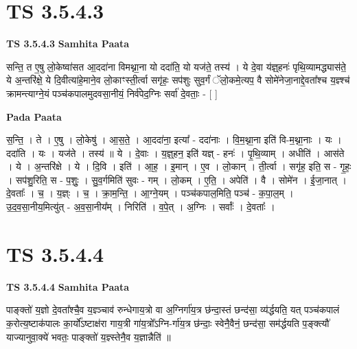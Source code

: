 \documentclass[17pt]{extarticle}
\begin{document}
\section*{ TS 3.5.4.3 }

\textbf{TS 3.5.4.3 } \newline
\textbf{Samhita Paata} \newline

सन्ति॒ त ए॒षु लो॒केष्वा॑सत आ॒ददा॑ना विमथ्ना॒ना यो ददा॑ति॒ यो यज॑ते॒ तस्य॑ । ये दे॒वा य॑ज्ञ्॒हनः॑ पृथि॒व्यामद्ध्यास॑ते॒ ये अ॒न्तरि॑क्षे॒ ये दि॒वीत्या॑हे॒माने॒व लो॒काꣳस्ती॒र्त्वा सगृ॑हः॒ सप॑शुः सुव॒र्गं ॅलो॒कमे॒त्यप॒ वै सोमे॑नेजा॒नाद्दे॒वता᳚श्च य॒ज्ञ्श्च॑ क्रामन्त्याग्ने॒यं पञ्च॑कपालमुदवसा॒नीयं॒ निर्व॑पेद॒ग्निः सर्वा॑ दे॒वताः॒ - [  ] \newline

\textbf{Pada Paata} \newline

स॒न्ति॒ । ते । ए॒षु । लो॒केषु॑ । आ॒स॒ते॒ । आ॒ददा॑ना॒ इत्या᳚ - ददा॑नाः । वि॒म॒थ्ना॒ना इति॑ वि-म॒थ्ना॒नाः । यः । ददा॑ति । यः । यज॑ते । तस्य॑ ॥ ये । दे॒वाः । य॒ज्ञ्॒हन॒ इति॑ यज्ञ् - हनः॑ । पृ॒थि॒व्याम् । अधीति॑ । आस॑ते । ये । अ॒न्तरि॑क्षे । ये । दि॒वि । इति॑ । आ॒ह॒ । इ॒मान् । ए॒व । लो॒कान् । ती॒र्त्वा । सगृ॑ह॒ इति॒ स - गृ॒हः॒ । सप॑शु॒रिति॒ स - प॒शुः॒ । सु॒व॒र्गमिति॑ सुवः - गम् । लो॒कम् । ए॒ति॒ । अपेति॑ । वै । सोमे॑न । ई॒जा॒नात् । दे॒वताः᳚ । च॒ । य॒ज्ञ्ः । च॒ । क्रा॒म॒न्ति॒ । आ॒ग्ने॒यम् । पञ्च॑कपाल॒मिति॒ पञ्च॑ - क॒पा॒ल॒म् । उ॒द॒व॒सा॒नीय॒मित्यु॑त् - अ॒व॒सा॒नीय᳚म् । निरिति॑ । व॒पे॒त् । अ॒ग्निः । सर्वाः᳚ । दे॒वताः᳚ ।  \newline




\section*{ TS 3.5.4.4 }

\textbf{TS 3.5.4.4 } \newline
\textbf{Samhita Paata} \newline

पाङ्क्तो॑ य॒ज्ञो दे॒वता᳚श्चै॒व य॒ज्ञ्ञ्चाव॑ रुन्धेगाय॒त्रो वा अ॒ग्निर्गा॑य॒त्र छ॑न्दा॒स्तं छन्द॑सा॒ व्य॑र्द्धयति॒ यत् पञ्च॑कपालं क॒रोत्य॒ष्टाक॑पालः का॒र्यो᳚ऽष्टाक्ष॑रा गाय॒त्री गा॑य॒त्रो᳚ऽग्नि-र्गा॑य॒त्र छ॑न्दाः॒ स्वेनै॒वैनं॒ छन्द॑सा॒ सम॑र्द्धयति प॒ङ्क्त्यौ॑ याज्यानुवा॒क्ये॑ भवतः॒ पाङ्क्तो॑ य॒ज्ञ्स्तेनै॒व य॒ज्ञान्नैति॑ ॥ \newline
\end{document}
